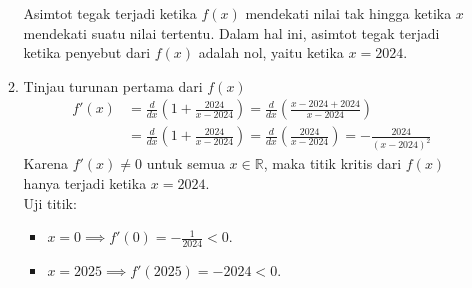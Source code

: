 \documentclass[10pt,openany,a4paper]{article}
\newcommand{\R}{\mathbb{R}}
\begin{document}
\begin{enumerate}
\begin{enumerate}
                    Asimtot tegak terjadi ketika $f(x)$ mendekati nilai tak hingga ketika $x$ mendekati suatu nilai tertentu. Dalam hal ini, asimtot tegak terjadi ketika penyebut dari $f(x)$ adalah nol, yaitu ketika $x = 2024$.
              \item Tinjau turunan pertama dari $f(x)$
                    \begin{align*}
                        f'(x) & = \frac{d}{dx}\left(1+\frac{2024}{x-2024}\right) = \frac{d}{dx}\left(\frac{x-2024+2024}{x-2024}\right)                     \\
                              & = \frac{d}{dx}\left(1+\frac{2024}{x-2024}\right) = \frac{d}{dx}\left(\frac{2024}{x-2024}\right) = -\frac{2024}{(x-2024)^2}
                    \end{align*}
                    Karena $f'(x)\neq 0$ untuk semua $x\in\R$, maka titik kritis dari $f(x)$ hanya terjadi ketika $x=2024$.\\
                    Uji titik:
                    \begin{itemize}
                        \item $x = 0 \implies f'(0) = -\frac{1}{2024} < 0$.
                        \item $x = 2025 \implies f'(2025) = -2024 < 0$.
                    \end{itemize}
                    \begin{center}
\end{center}
\end{enumerate}
\end{enumerate}
\end{document}
